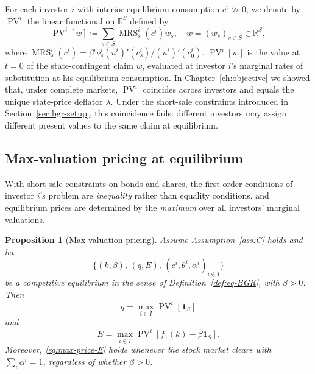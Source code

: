 \documentclass[11pt,a4paper,oneside]{book}
\def\R{\mathbb{R}}
\def\1{\mathbf{1}}
\DeclareMathOperator{\MRS}{MRS}
\DeclareMathOperator{\PV}{PV}
\theoremstyle{plain}
\newtheorem{proposition}[theorem]{Proposition}
\theoremstyle{definition}
\theoremstyle{remark}
\numberwithin{equation}{chapter}
\begin{document}
For each investor $i$ with interior equilibrium consumption $c^i \gg 0$, we denote by $\PV^i$ the linear functional on $\R^S$ defined by
\begin{equation}\label{eq:PV-def}
  \PV^i[w] \coloneqq \sum_{s \in S} \MRS^i_s(c^i) w_s,
  \quad w = (w_s)_{s \in S} \in \R^S,
\end{equation}
where $\MRS^i_s(c^i) = \beta^i \nu^i_s (u^i)'(c^i_s) / (u^i)'(c^i_0)$.
$\PV^i[w]$ is the value at $t=0$ of the state-contingent claim $w$, evaluated at investor $i$'s marginal rates of substitution at his equilibrium consumption.
In Chapter~\ref{ch:objective} we showed that, under complete markets, $\PV^i$ coincides across investors and equals the unique state-price deflator $\lambda$.
Under the short-sale constraints introduced in Section~\ref{sec:bgr-setup}, this coincidence fails: different investors may assign different present values to the same claim at equilibrium.

\subsection{Max-valuation pricing at equilibrium}

With short-sale constraints on bonds and shares, the first-order conditions of investor $i$'s problem are \emph{inequality} rather than equality conditions, and equilibrium prices are determined by the \emph{maximum} over all investors' marginal valuations.

\begin{proposition}[Max-valuation pricing]\label{prop:max-pricing}
Assume Assumption~\ref{ass:C} holds and let
\begin{equation*}
  \bigl\{ (k, \beta), \, (q, E), \, (c^i, \theta^i, \alpha^i)_{i \in I} \bigr\}
\end{equation*}
be a competitive equilibrium in the sense of Definition~\ref{def:eq-BGR}, with $\beta > 0$.
Then
\begin{equation}\label{eq:max-price-q}
  q = \max_{i \in I} \PV^i[\1_S]
\end{equation}
and
\begin{equation}\label{eq:max-price-E}
  E = \max_{i \in I} \PV^i[f_1(k) - \beta \1_S].
\end{equation}
Moreover, \eqref{eq:max-price-E} holds whenever the stock market clears with $\sum_i \alpha^i = 1$, regardless of whether $\beta > 0$.
\end{proposition}
\end{document}
